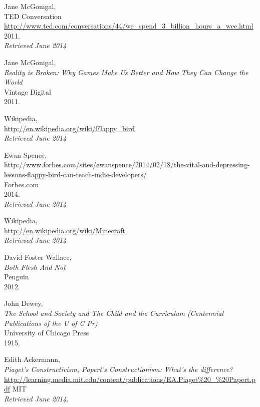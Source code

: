 \begin{thebibliography}{99}

  Jane McGonigal, \\
  TED Conversation \\
  \url{http://www.ted.com/conversations/44/we_spend_3_billion_hours_a_wee.html} \\
  2011. \\
  \emph{Retrieved June 2014}

  Jane McGonigal, \\
  \emph{Reality is Broken: Why Games Make Us Better and How They Can Change the World} \\
  Vintage Digital \\
  2011.

  Wikipedia, \\
  \url{http://en.wikipedia.org/wiki/Flappy_bird} \\
  \emph{Retrieved June 2014}

  Ewan Spence, \\
  \url{http://www.forbes.com/sites/ewanspence/2014/02/18/the-vital-and-depressing-lessons-flappy-bird-can-teach-indie-developers/} \\
  Forbes.com \\
  2014. \\
  \emph{Retrieved June 2014}

  Wikipedia, \\
  \url{http://en.wikipedia.org/wiki/Minecraft} \\
  \emph{Retrieved June 2014}

  David Foster Wallace, \\
  \emph{Both Flesh And Not} \\
  Penguin \\
  2012.

  John Dewey, \\
  \emph{The School and Society and The Child and the Curriculum (Centennial Publications of the U of C Pr)} \\
  University of Chicago Press \\
  1915.

  Edith Ackermann, \\
  \emph{Piaget’s Constructivism, Papert’s Constructionism: 
What’s the difference?} \\
  \url{http://learning.media.mit.edu/content/publications/EA.Piaget%20_%20Papert.pdf}
  MIT \\
  \emph{Retrieved June 2014}.


\end{thebibliography}
